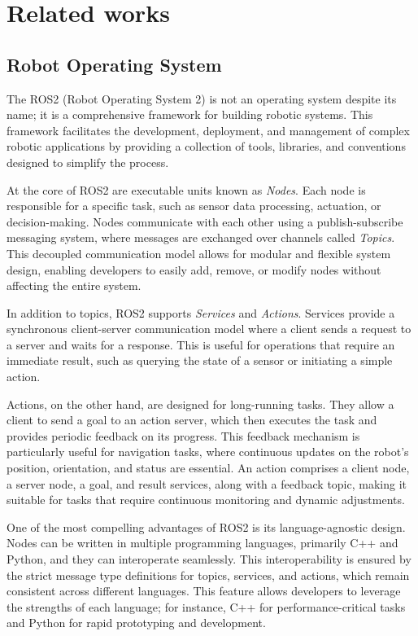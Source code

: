 \chapter{Related works} \label{related_works}

\section{Robot Operating System}

The ROS2 \cite{ROS2} (Robot Operating System 2) is not an operating system despite its name; it is a comprehensive framework for building robotic systems. This framework facilitates the development, deployment, and management of complex robotic applications by providing a collection of tools, libraries, and conventions designed to simplify the process.

At the core of ROS2 are executable units known as \textit{Nodes}. Each node is responsible for a specific task, such as sensor data processing, actuation, or decision-making. Nodes communicate with each other using a publish-subscribe messaging system, where messages are exchanged over channels called \textit{Topics}. This decoupled communication model allows for modular and flexible system design, enabling developers to easily add, remove, or modify nodes without affecting the entire system.

In addition to topics, ROS2 supports \textit{Services} and \textit{Actions}. Services provide a synchronous client-server communication model where a client sends a request to a server and waits for a response. This is useful for operations that require an immediate result, such as querying the state of a sensor or initiating a simple action.

Actions, on the other hand, are designed for long-running tasks. They allow a client to send a goal to an action server, which then executes the task and provides periodic feedback on its progress. This feedback mechanism is particularly useful for navigation tasks, where continuous updates on the robot's position, orientation, and status are essential. An action comprises a client node, a server node, a goal, and result services, along with a feedback topic, making it suitable for tasks that require continuous monitoring and dynamic adjustments.

One of the most compelling advantages of ROS2 is its language-agnostic design. Nodes can be written in multiple programming languages, primarily C++ and Python, and they can interoperate seamlessly. This interoperability is ensured by the strict message type definitions for topics, services, and actions, which remain consistent across different languages. This feature allows developers to leverage the strengths of each language; for instance, C++ for performance-critical tasks and Python for rapid prototyping and development.


